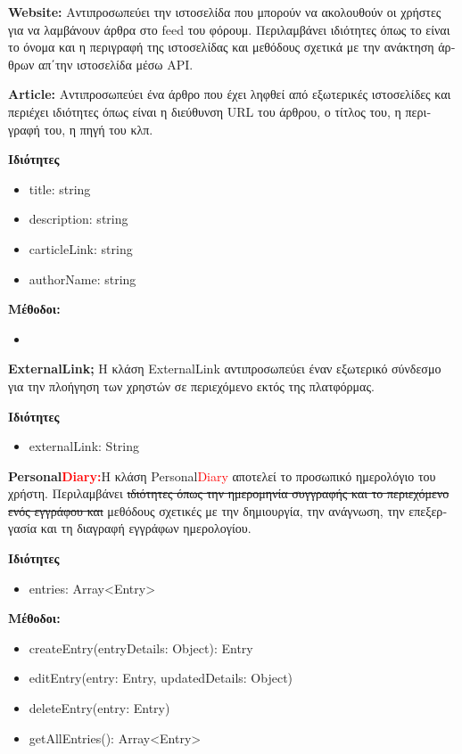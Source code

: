 \documentclass{article}
\begin{document}
\textbf{Website:} \textgreek{Αντιπροσωπεύει την ιστοσελίδα που μπορούν να ακολουθούν οι χρήστες για να λαμβάνουν άρθρα στο} feed \textgreek{του φόρουμ. Περιλαμβάνει ιδιότητες όπως το είναι το όνομα και η περιγραφή της ιστοσελίδας και μεθόδους σχετικά με την ανάκτηση άρθρων απ΄την ιστοσελίδα μέσω} API.
\newline
\newline


\textbf{Article:} \textgreek{Αντιπροσωπεύει ένα άρθρο που έχει ληφθεί από εξωτερικές ιστοσελίδες και περιέχει ιδιότητες όπως είναι η διεύθυνση} URL \textgreek{του άρθρου, ο τίτλος του, η περιγραφή του, η πηγή του κλπ.}
\newline
\newline

\textbf{\textgreek{Ιδιότητες}}
\begin{itemize}
    \item title: string
    \item description: string
    \item carticleLink: string
    \item authorName: string
\end{itemize}
\textbf{\textgreek{Μέθοδοι:}}
\begin{itemize}
    \item 
\end{itemize}

\textbf{ExternalLink;} \textgreek{Η κλάση} ExternalLink \textgreek{αντιπροσωπεύει έναν εξωτερικό σύνδεσμο για την πλοήγηση των χρηστών σε περιεχόμενο εκτός της πλατφόρμας.}
\newline
\newline

\textbf{\textgreek{Ιδιότητες}}
\begin{itemize}
    \item externalLink: String
\end{itemize}

\textbf{Personal\textcolor{red}{Diary:}}\textgreek{Η κλάση} Personal\textcolor{red}{Diary} \textgreek{αποτελεί το προσωπικό ημερολόγιο του χρήστη. Περιλαμβάνει \st{ιδιότητες όπως την ημερομηνία συγγραφής και το περιεχόμενο ενός εγγράφου και} μεθόδους σχετικές με την δημιουργία, την ανάγνωση, την επεξεργασία και τη διαγραφή εγγράφων ημερολογίου.}
\newline
\newline

\textbf{\textgreek{Ιδιότητες}}
\begin{itemize}
    \item entries: Array<Entry>
\end{itemize}
\textbf{\textgreek{Μέθοδοι:}}
\begin{itemize}
    \item createEntry(entryDetails: Object): Entry
    \item editEntry(entry: Entry, updatedDetails: Object)
    \item deleteEntry(entry: Entry)
    \item getAllEntries(): Array<Entry>
\end{itemize}
\end{document}
